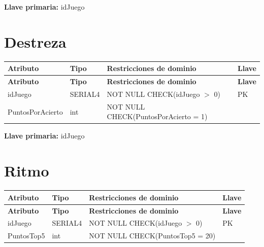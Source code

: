\documentclass[12pt]{article}
\begin{document}
\vspace{2pt}
\textbf{Llave primaria:} idJuego\\


\section*{Destreza}

\begin{longtable}{p{3.5cm} p{2.5cm} p{7.5cm} p{1.5cm}}
\label{tab:destreza}\\
\toprule
\textbf{Atributo} & \textbf{Tipo} & \textbf{Restricciones de dominio} & \textbf{Llave} \\
\midrule
\endfirsthead

\toprule
\textbf{Atributo} & \textbf{Tipo} & \textbf{Restricciones de dominio} & \textbf{Llave} \\
\midrule
\endhead

\bottomrule
\endfoot

idJuego 
& SERIAL4 
& NOT NULL \newline CHECK(idJuego $>$ 0)
& PK \\

PuntosPorAcierto 
& int
& NOT NULL \newline CHECK(PuntosPorAcierto = 1)
& \\

\end{longtable}

\vspace{2pt}
\textbf{Llave primaria:} idJuego\\

\section*{Ritmo}

\begin{longtable}{p{3.5cm} p{2.5cm} p{7.5cm} p{1.5cm}}
\label{tab:ritmo}\\
\toprule
\textbf{Atributo} & \textbf{Tipo} & \textbf{Restricciones de dominio} & \textbf{Llave} \\
\midrule
\endfirsthead

\toprule
\textbf{Atributo} & \textbf{Tipo} & \textbf{Restricciones de dominio} & \textbf{Llave} \\
\midrule
\endhead

\bottomrule
\endfoot

idJuego 
& SERIAL4
& NOT NULL \newline CHECK(idJuego $>$ 0)
& PK \\

PuntosTop5 
& int
& NOT NULL \newline CHECK(PuntosTop5 = 20)
& \\

\end{longtable}
\end{document}
